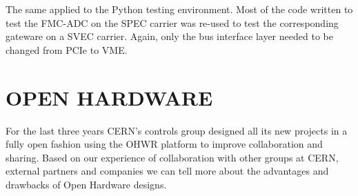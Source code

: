 \documentclass{JAC2003}
\begin{document}
The same applied to the Python testing environment.
Most of the code written to test the FMC-ADC on the SPEC carrier was re-used to test the corresponding gateware on a SVEC carrier.
Again, only the bus interface layer needed to be changed from PCIe to VME.

\begin{comment}
\subsection{Release Concept}
Usually, a single product involves several different OHWR projects.
By product, we mean a functional set of carrier and mezzanine boards along with gateware and software (e.g FMC-ADC + SPEC).
For a user to be able to use a product, at least three projects are needed; the carrier project for the golden bitstream, the mezzanine project for the application bitstream and the mezzanine software support project for the Linux device driver and test program.
To have better traceability, a release procedure was put in place.
For each component (gateware or software), the development is frozen into a \textit{release}.
In addition, compatible releases of the gateware and software are bundled together in an archive.
\end{comment}



\section{OPEN HARDWARE}
%

For the last three years CERN's controls group designed all its new projects in a fully open fashion using the OHWR platform to improve collaboration and sharing.
Based on our experience of collaboration with other groups at CERN, external partners and companies we can tell more about the advantages and drawbacks of Open Hardware designs.
\end{document}
